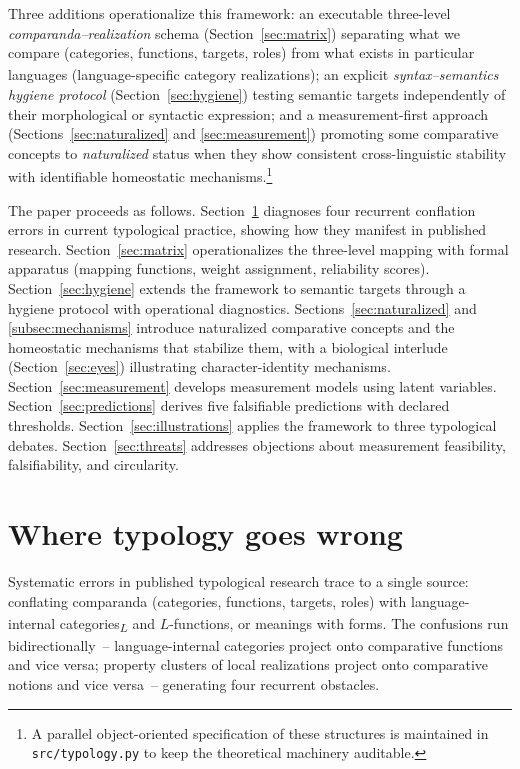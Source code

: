 \documentclass[12pt]{article}
\begin{document}
Three additions operationalize this framework: an executable three-level \emph{comparanda--realization} schema (Section~\ref{sec:matrix}) separating what we compare (categories\textsubscript{\Cross}, functions\textsubscript{\Cross}, targets\textsubscript{\Cross}, roles\textsubscript{\Cross}) from what exists in particular languages (language-specific category realizations); an explicit \emph{syntax--semantics hygiene protocol} (Section~\ref{sec:hygiene}) testing semantic targets independently of their morphological or syntactic expression; and a measurement-first approach (Sections~\ref{sec:naturalized} and \ref{sec:measurement}) promoting some comparative concepts to \emph{naturalized} status when they show consistent cross-linguistic stability with identifiable homeostatic mechanisms.\footnote{A parallel object-oriented specification of these structures is maintained in \texttt{src/typology.py} to keep the theoretical machinery auditable.}

The paper proceeds as follows. Section~\ref{sec:failures} diagnoses four recurrent conflation errors in current typological practice, showing how they manifest in published research. Section~\ref{sec:matrix} operationalizes the three-level mapping with formal apparatus (mapping functions, weight assignment, reliability scores). Section~\ref{sec:hygiene} extends the framework to semantic targets through a hygiene protocol with operational diagnostics. Sections~\ref{sec:naturalized} and \ref{subsec:mechanisms} introduce naturalized comparative concepts and the homeostatic mechanisms that stabilize them, with a biological interlude (Section~\ref{sec:eyes}) illustrating character-identity mechanisms. Section~\ref{sec:measurement} develops measurement models using latent variables. Section~\ref{sec:predictions} derives five falsifiable predictions with declared thresholds. Section~\ref{sec:illustrations} applies the framework to three typological debates. Section~\ref{sec:threats} addresses objections about measurement feasibility, falsifiability, and circularity.

\section{Where typology goes wrong}\label{sec:failures}
Systematic errors in published typological research trace to a single source: conflating comparanda (categories\textsubscript{\Cross}, functions\textsubscript{\Cross}, targets\textsubscript{\Cross}, roles\textsubscript{\Cross}) with language-internal categories\textsubscript{$L$} and $L$-functions, or meanings with forms. The confusions run bidirectionally~-- language-internal categories project onto comparative functions and vice versa; property clusters of local realizations project onto comparative notions and vice versa~-- generating four recurrent obstacles.
\end{document}
